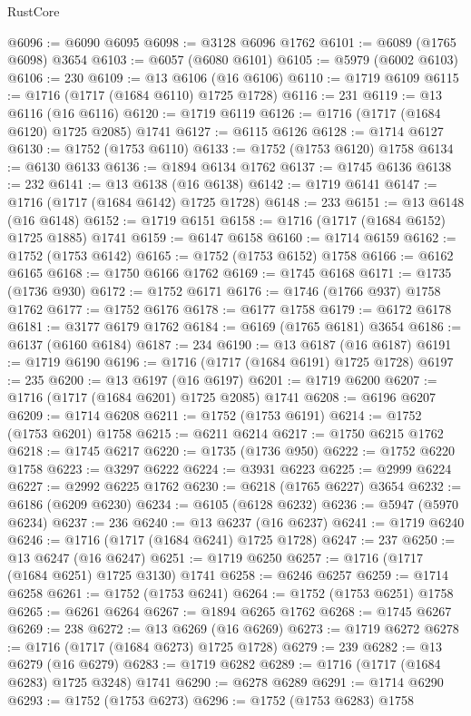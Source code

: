 \begin{lexlean}{RustCore}
\begin{coremodule}
@6096 := @6090 @6095
@6098 := @3128 @6096 @1762
@6101 := @6089 (@1765 @6098) @3654
@6103 := @6057 (@6080 @6101)
@6105 := @5979 (@6002 @6103)
@6106 := 230
@6109 := @13 @6106 (@16 @6106)
@6110 := @1719 @6109
@6115 := @1716 (@1717 (@1684 @6110) @1725 @1728)
@6116 := 231
@6119 := @13 @6116 (@16 @6116)
@6120 := @1719 @6119
@6126 := @1716 (@1717 (@1684 @6120) @1725 @2085) @1741
@6127 := @6115 @6126
@6128 := @1714 @6127
@6130 := @1752 (@1753 @6110)
@6133 := @1752 (@1753 @6120) @1758
@6134 := @6130 @6133
@6136 := @1894 @6134 @1762
@6137 := @1745 @6136
@6138 := 232
@6141 := @13 @6138 (@16 @6138)
@6142 := @1719 @6141
@6147 := @1716 (@1717 (@1684 @6142) @1725 @1728)
@6148 := 233
@6151 := @13 @6148 (@16 @6148)
@6152 := @1719 @6151
@6158 := @1716 (@1717 (@1684 @6152) @1725 @1885) @1741
@6159 := @6147 @6158
@6160 := @1714 @6159
@6162 := @1752 (@1753 @6142)
@6165 := @1752 (@1753 @6152) @1758
@6166 := @6162 @6165
@6168 := @1750 @6166 @1762
@6169 := @1745 @6168
@6171 := @1735 (@1736 @930)
@6172 := @1752 @6171
@6176 := @1746 (@1766 @937) @1758 @1762
@6177 := @1752 @6176
@6178 := @6177 @1758
@6179 := @6172 @6178
@6181 := @3177 @6179 @1762
@6184 := @6169 (@1765 @6181) @3654
@6186 := @6137 (@6160 @6184)
@6187 := 234
@6190 := @13 @6187 (@16 @6187)
@6191 := @1719 @6190
@6196 := @1716 (@1717 (@1684 @6191) @1725 @1728)
@6197 := 235
@6200 := @13 @6197 (@16 @6197)
@6201 := @1719 @6200
@6207 := @1716 (@1717 (@1684 @6201) @1725 @2085) @1741
@6208 := @6196 @6207
@6209 := @1714 @6208
@6211 := @1752 (@1753 @6191)
@6214 := @1752 (@1753 @6201) @1758
@6215 := @6211 @6214
@6217 := @1750 @6215 @1762
@6218 := @1745 @6217
@6220 := @1735 (@1736 @950)
@6222 := @1752 @6220 @1758
@6223 := @3297 @6222
@6224 := @3931 @6223
@6225 := @2999 @6224
@6227 := @2992 @6225 @1762
@6230 := @6218 (@1765 @6227) @3654
@6232 := @6186 (@6209 @6230)
@6234 := @6105 (@6128 @6232)
@6236 := @5947 (@5970 @6234)
@6237 := 236
@6240 := @13 @6237 (@16 @6237)
@6241 := @1719 @6240
@6246 := @1716 (@1717 (@1684 @6241) @1725 @1728)
@6247 := 237
@6250 := @13 @6247 (@16 @6247)
@6251 := @1719 @6250
@6257 := @1716 (@1717 (@1684 @6251) @1725 @3130) @1741
@6258 := @6246 @6257
@6259 := @1714 @6258
@6261 := @1752 (@1753 @6241)
@6264 := @1752 (@1753 @6251) @1758
@6265 := @6261 @6264
@6267 := @1894 @6265 @1762
@6268 := @1745 @6267
@6269 := 238
@6272 := @13 @6269 (@16 @6269)
@6273 := @1719 @6272
@6278 := @1716 (@1717 (@1684 @6273) @1725 @1728)
@6279 := 239
@6282 := @13 @6279 (@16 @6279)
@6283 := @1719 @6282
@6289 := @1716 (@1717 (@1684 @6283) @1725 @3248) @1741
@6290 := @6278 @6289
@6291 := @1714 @6290
@6293 := @1752 (@1753 @6273)
@6296 := @1752 (@1753 @6283) @1758

\end{coremodule}
\end{lexlean}
